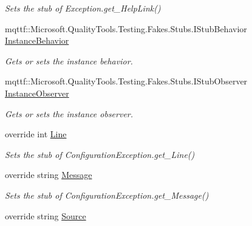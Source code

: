 \begin{DoxyCompactItemize}
\begin{DoxyCompactList}\small\item\em Sets the stub of Exception.\-get\-\_\-\-Help\-Link()\end{DoxyCompactList}\item 
mqttf\-::\-Microsoft.\-Quality\-Tools.\-Testing.\-Fakes.\-Stubs.\-I\-Stub\-Behavior \hyperlink{class_system_1_1_configuration_1_1_fakes_1_1_stub_configuration_exception_a0146fc96238d55eb9d3359604a199fc1}{Instance\-Behavior}
\begin{DoxyCompactList}\small\item\em Gets or sets the instance behavior.\end{DoxyCompactList}\item 
mqttf\-::\-Microsoft.\-Quality\-Tools.\-Testing.\-Fakes.\-Stubs.\-I\-Stub\-Observer \hyperlink{class_system_1_1_configuration_1_1_fakes_1_1_stub_configuration_exception_a0ac072f0a45d661ccd543f2ac1c344c7}{Instance\-Observer}
\begin{DoxyCompactList}\small\item\em Gets or sets the instance observer.\end{DoxyCompactList}\item 
override int \hyperlink{class_system_1_1_configuration_1_1_fakes_1_1_stub_configuration_exception_a54981c421cb5750c972655b3bfdf6926}{Line}
\begin{DoxyCompactList}\small\item\em Sets the stub of Configuration\-Exception.\-get\-\_\-\-Line()\end{DoxyCompactList}\item 
override string \hyperlink{class_system_1_1_configuration_1_1_fakes_1_1_stub_configuration_exception_aae1e2a25f7e79cf5a6b02b930840ca5e}{Message}
\begin{DoxyCompactList}\small\item\em Sets the stub of Configuration\-Exception.\-get\-\_\-\-Message()\end{DoxyCompactList}\item 
override string \hyperlink{class_system_1_1_configuration_1_1_fakes_1_1_stub_configuration_exception_aca3d15e4fdd72086ae3084501c579fff}{Source}

\end{DoxyCompactItemize}
